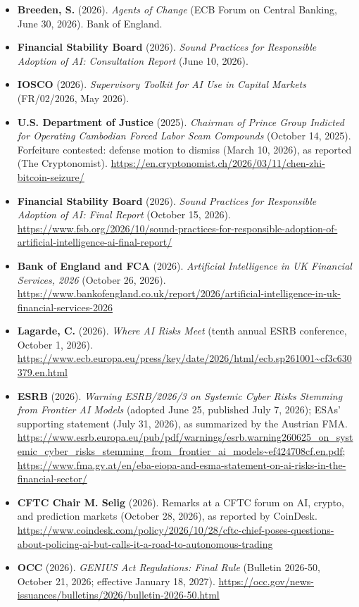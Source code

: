 \documentclass[11pt,letterpaper]{article}
\begin{document}
\begin{itemize}[leftmargin=1.5em]
  \item \textbf{Breeden, S.} (2026). \textit{Agents of Change} (ECB Forum on Central Banking, June 30, 2026). Bank of England.
  \item \textbf{Financial Stability Board} (2026). \textit{Sound Practices for Responsible Adoption of AI: Consultation Report} (June 10, 2026).
  \item \textbf{IOSCO} (2026). \textit{Supervisory Toolkit for AI Use in Capital Markets} (FR/02/2026, May 2026).
  \item \textbf{U.S. Department of Justice} (2025). \textit{Chairman of Prince Group Indicted for Operating Cambodian Forced Labor Scam Compounds} (October 14, 2025). Forfeiture contested: defense motion to dismiss (March 10, 2026), as reported (The Cryptonomist). \url{https://en.cryptonomist.ch/2026/03/11/chen-zhi-bitcoin-seizure/}
  \item \textbf{Financial Stability Board} (2026). \textit{Sound Practices for Responsible Adoption of AI: Final Report} (October 15, 2026). \url{https://www.fsb.org/2026/10/sound-practices-for-responsible-adoption-of-artificial-intelligence-ai-final-report/}
  \item \textbf{Bank of England and FCA} (2026). \textit{Artificial Intelligence in UK Financial Services, 2026} (October 26, 2026). \url{https://www.bankofengland.co.uk/report/2026/artificial-intelligence-in-uk-financial-services-2026}
  \item \textbf{Lagarde, C.} (2026). \textit{Where AI Risks Meet} (tenth annual ESRB conference, October 1, 2026). \url{https://www.ecb.europa.eu/press/key/date/2026/html/ecb.sp261001~cf3c630379.en.html}
  \item \textbf{ESRB} (2026). \textit{Warning ESRB/2026/3 on Systemic Cyber Risks Stemming from Frontier AI Models} (adopted June 25, published July 7, 2026); ESAs' supporting statement (July 31, 2026), as summarized by the Austrian FMA. \url{https://www.esrb.europa.eu/pub/pdf/warnings/esrb.warning260625_on_systemic_cyber_risks_stemming_from_frontier_ai_models~ef424708cf.en.pdf}; \url{https://www.fma.gv.at/en/eba-eiopa-and-esma-statement-on-ai-risks-in-the-financial-sector/}
  \item \textbf{CFTC Chair M. Selig} (2026). Remarks at a CFTC forum on AI, crypto, and prediction markets (October 28, 2026), as reported by CoinDesk. \url{https://www.coindesk.com/policy/2026/10/28/cftc-chief-poses-questions-about-policing-ai-but-calls-it-a-road-to-autonomous-trading}
  \item \textbf{OCC} (2026). \textit{GENIUS Act Regulations: Final Rule} (Bulletin 2026-50, October 21, 2026; effective January 18, 2027). \url{https://occ.gov/news-issuances/bulletins/2026/bulletin-2026-50.html}

\end{itemize}
\end{document}
